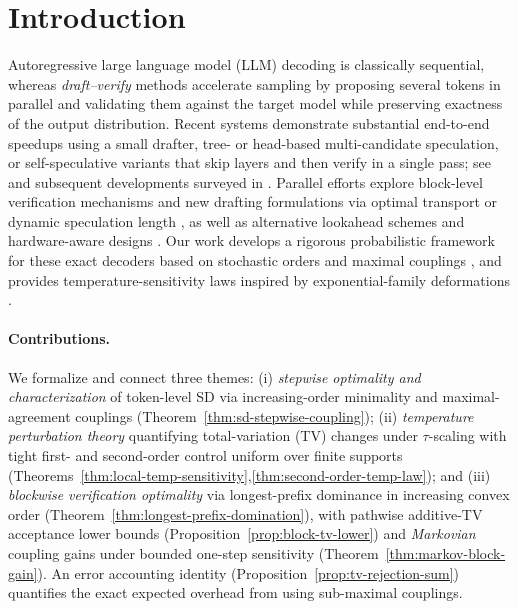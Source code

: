 \documentclass[11pt]{article}
\numberwithin{equation}{section}
\theoremstyle{plain}
\theoremstyle{definition}
\theoremstyle{remark}
\begin{document}
\section{Introduction}
Autoregressive large language model (LLM) decoding is classically sequential, whereas \emph{draft--verify} methods accelerate sampling by proposing several tokens in parallel and validating them against the target model while preserving exactness of the output distribution. Recent systems demonstrate substantial end-to-end speedups using a small drafter, tree- or head-based multi-candidate speculation, or self-speculative variants that skip layers and then verify in a single pass; see \cite{Leviathan2023SpeculativeDecoding,Xia2022SpeculativeDecoding} and subsequent developments surveyed in \cite{Xia2024Survey}. Parallel efforts explore block-level verification mechanisms \cite{Sun2024BlockVerification} and new drafting formulations via optimal transport or dynamic speculation length \cite{Sun2023SpecTr,Mamou2024DISCO}, as well as alternative lookahead schemes \cite{Fu2024Lookahead} and hardware-aware designs \cite{Chen2024Sequoia}. Our work develops a rigorous probabilistic framework for these exact decoders based on stochastic orders \cite{ShakedShanthikumar2007StochasticOrders} and maximal couplings \cite{Lindvall2002CouplingMethod}, and provides temperature-sensitivity laws inspired by exponential-family deformations \cite{Naudts2009QExponentialFamily}.

\paragraph{Contributions.}
We formalize and connect three themes: (i) \emph{stepwise optimality and characterization} of token-level SD via increasing-order minimality and maximal-agreement couplings (Theorem~\ref{thm:sd-stepwise-coupling}); (ii) \emph{temperature perturbation theory} quantifying total-variation (TV) changes under $\tau$-scaling with tight first- and second-order control uniform over finite supports (Theorems~\ref{thm:local-temp-sensitivity},\ref{thm:second-order-temp-law}); and (iii) \emph{blockwise verification optimality} via longest-prefix dominance in increasing convex order (Theorem~\ref{thm:longest-prefix-domination}), with pathwise additive-TV acceptance lower bounds (Proposition~\ref{prop:block-tv-lower}) and \emph{Markovian} coupling gains under bounded one-step sensitivity (Theorem~\ref{thm:markov-block-gain}). An error accounting identity (Proposition~\ref{prop:tv-rejection-sum}) quantifies the exact expected overhead from using sub-maximal couplings.
\end{document}
